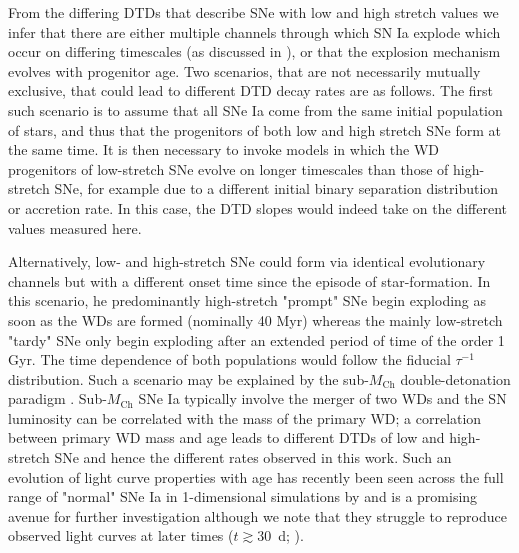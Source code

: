 \documentclass[fleqn,usenatbib]{mnras}
\begin{document}
From the differing DTDs that describe SNe with low and high stretch values we infer that there are either multiple channels through which SN Ia explode which occur on differing timescales (as discussed in \citet{Hakobyan2020}), or that the explosion mechanism evolves with progenitor age. Two scenarios, that are not necessarily mutually exclusive, that could lead to different DTD decay rates are as follows. 
The first such scenario is to assume that all SNe Ia come from the same initial population of stars, and thus that the progenitors of both low and high stretch SNe form at the same time. It is then necessary to invoke models in which the WD progenitors of low-stretch SNe evolve on longer timescales than those of high-stretch SNe, for example due to a different initial binary separation distribution or accretion rate. In this case, the DTD slopes would indeed take on the different values measured here.

Alternatively, low- and high-stretch SNe could form via identical evolutionary channels but with a different onset time since the episode of star-formation. In this scenario, he predominantly high-stretch "prompt" SNe begin exploding as soon as the WDs are formed (nominally 40 Myr) whereas the mainly low-stretch "tardy" SNe only begin exploding after an extended period of time of the order 1 Gyr. The time dependence of both populations would follow the fiducial $\tau^{-1}$ distribution.
Such a scenario may be explained by the sub-$M_{\mathrm{Ch}}$ double-detonation paradigm \citep[e.g.][]{Sim2010,Blondin2017,Shen2017}. Sub-$M_{\mathrm{Ch}}$ SNe Ia typically involve the merger of two WDs and the SN luminosity can be correlated with the mass of the primary WD; a correlation between primary WD mass and age leads to different DTDs of low and high-stretch SNe and hence the different rates observed in this work. Such an evolution of light curve properties with age has recently been seen across the full range of "normal" SNe Ia in 1-dimensional simulations by \citet{Shen2021} and is a promising avenue for further investigation although we note that they struggle to reproduce observed light curves at later times ($t\gtrsim30$~d; \citealt{Shen2021,Gronow2021}).
\end{document}
